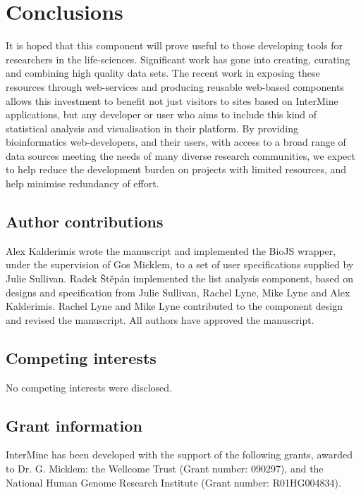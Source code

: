 \documentclass[10pt,a4paper,twocolumn]{article}
\begin{document}
\section*{Conclusions}

It is hoped that this component will prove useful to those developing tools for
researchers in the life-sciences. Significant work has gone into creating,
curating and combining high quality data sets. The recent work in exposing these
resources through web-services and producing reusable web-based components
allows this investment to benefit not just visitors to sites based on InterMine
applications, but any developer or user who aims to include this kind of
statistical analysis and visualisation in their platform. By providing
bioinformatics web-developers, and their users, with access to a broad range of
data sources meeting the needs of many diverse research communities, we
expect to help reduce the development burden on projects with limited resources,
and help minimise redundancy of effort.

\subsection*{Author contributions}

Alex Kalderimis wrote the manuscript and implemented the BioJS wrapper, under
the supervision of Gos Micklem, to a set of user specifications supplied by
Julie Sullivan. Radek Štěpán implemented the list analysis component, based on
designs and specification from Julie Sullivan, Rachel Lyne, Mike Lyne and Alex
Kalderimis. Rachel Lyne and Mike Lyne contributed to the component design and
revised the manuscript. All authors have approved the manuscript.

\subsection*{Competing interests}

No competing interests were disclosed.

\subsection*{Grant information}

InterMine has been developed with the support of the following grants, awarded
to Dr. G. Micklem: the Wellcome Trust (Grant number: 090297), and the National
Human Genome Research Institute (Grant number: R01HG004834).
\end{document}
